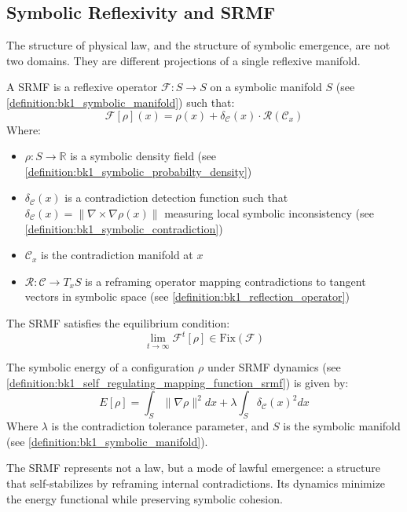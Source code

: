 \subsection{Symbolic Reflexivity and SRMF}
\label{subsec:bk1_symbolic_reflexivity_and_srmf}
\begin{axiom}
\label{axiom:bk1_symbolic_primacy}
The structure of physical law, and the structure of symbolic emergence, are not two domains. They are different projections of a single reflexive manifold.
\end{axiom}
\begin{definition}
\label{definition:bk1_self_regulating_mapping_function_srmf}
A SRMF is a reflexive operator $\mathcal{F}: S \to S$ on a symbolic manifold $S$ (see \ref{definition:bk1_symbolic_manifold}) such that:
\[
\mathcal{F}[\rho](x) = \rho(x) + \delta_{\mathcal{C}}(x) \cdot \mathcal{R}(\mathcal{C}_x)
\]
Where:
\begin{itemize}
\item $\rho: S \to \mathbb{R}$ is a symbolic density field (see \ref{definition:bk1_symbolic_probabilty_density})
\item $\delta_{\mathcal{C}}(x)$ is a contradiction detection function such that $\delta_{\mathcal{C}}(x) = \|\nabla \times \nabla \rho(x)\|$ measuring local symbolic inconsistency (see \ref{definition:bk1_symbolic_contradiction})
\item $\mathcal{C}_x$ is the contradiction manifold at $x$
\item $\mathcal{R}: \mathcal{C} \to T_xS$ is a reframing operator mapping contradictions to tangent vectors in symbolic space (see \ref{definition:bk1_reflection_operator})
\end{itemize}
The SRMF satisfies the equilibrium condition:
\[
\lim_{t \to \infty} \mathcal{F}^t[\rho] \in \text{Fix}(\mathcal{F})
\]
\end{definition}
\begin{definition}
\label{definition:bk1_srmf_energy_functional}
The symbolic energy of a configuration $\rho$ under SRMF dynamics (see \ref{definition:bk1_self_regulating_mapping_function_srmf}) is given by:
\[
E[\rho] = \int_S \|\nabla \rho\|^2 dx + \lambda \int_S \delta_{\mathcal{C}}(x)^2 dx
\]
Where $\lambda$ is the contradiction tolerance parameter, and $S$ is the symbolic manifold (see \ref{definition:bk1_symbolic_manifold}).
\end{definition}

\begin{remark}
The SRMF represents not a law, but a mode of lawful emergence: a structure that self-stabilizes by reframing internal contradictions. Its dynamics minimize the energy functional while preserving symbolic cohesion.
\end{remark}
